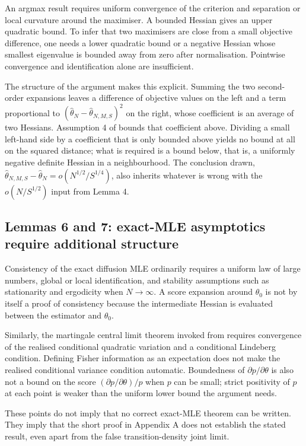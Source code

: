 \documentclass[11pt]{article}
\theoremstyle{definition}
\newcommand{\thetao}{\theta_0}
\begin{document}
An argmax result requires uniform convergence of the criterion and separation or local curvature around the maximiser. A bounded Hessian gives an upper quadratic bound. To infer that two maximisers are close from a small objective difference, one needs a lower quadratic bound or a negative Hessian whose smallest eigenvalue is bounded away from zero after normalisation. Pointwise convergence and identification alone are insufficient.

The structure of the argument makes this explicit. Summing the two second-order expansions leaves a difference of objective values on the left and a term proportional to $(\widehat\theta_N-\widehat\theta_{N,M,S})^2$ on the right, whose coefficient is an average of two Hessians. Assumption 4 of \citet{BrandtSantaClara2002} bounds that coefficient above. Dividing a small left-hand side by a coefficient that is only bounded above yields no bound at all on the squared distance; what is required is a bound below, that is, a uniformly negative definite Hessian in a neighbourhood. The conclusion drawn, $\widehat\theta_{N,M,S}-\widehat\theta_N=o(N^{1/2}/S^{1/4})$, also inherits whatever is wrong with the $o(N/S^{1/2})$ input from Lemma 4.

\subsection{Lemmas 6 and 7: exact-MLE asymptotics require additional structure}

Consistency of the exact diffusion MLE ordinarily requires a uniform law of large numbers, global or local identification, and stability assumptions such as stationarity and ergodicity when $N\to\infty$. A score expansion around $\thetao$ is not by itself a proof of consistency because the intermediate Hessian is evaluated between the estimator and $\thetao$.

Similarly, the martingale central limit theorem invoked from \citet{HallHeyde1980} requires convergence of the realised conditional quadratic variation and a conditional Lindeberg condition. Defining Fisher information as an expectation does not make the realised conditional variance condition automatic. Boundedness of $\partial p/\partial\theta$ is also not a bound on the score $(\partial p/\partial\theta)/p$ when $p$ can be small; strict positivity of $p$ at each point is weaker than the uniform lower bound the argument needs.

These points do not imply that no correct exact-MLE theorem can be written. They imply that the short proof in Appendix A does not establish the stated result, even apart from the false transition-density joint limit.
\end{document}
